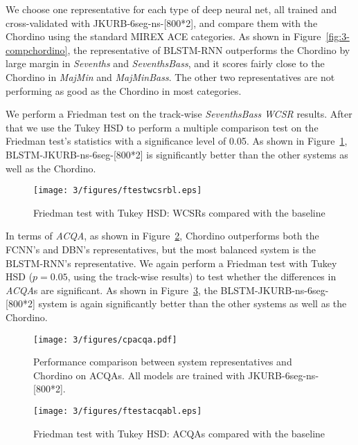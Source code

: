 We choose one representative for each type of deep neural net, all trained and cross-validated with JKURB-6seg-ns-[800*2], and compare them with the Chordino using the standard MIREX ACE categories. As shown in Figure~\ref{fig:3-compchordino}, the representative of BLSTM-RNN outperforms the Chordino by large margin in \textit{Sevenths} and \textit{SeventhsBass}, and it scores fairly close to the Chordino in \textit{MajMin} and \textit{MajMinBass}. The other two representatives are not performing as good as the Chordino in most categories.

We perform a Friedman test on the track-wise \textit{SeventhsBass} \textit{WCSR} results. After that we use the Tukey HSD to perform a multiple comparison test on the Friedman test's statistics with a significance level of 0.05. As shown in Figure~\ref{fig:3-friedmanwcsrbl}, BLSTM-JKURB-ns-6seg-[800*2] is significantly better than the other systems as well as the Chordino.
\begin{figure}[h!]
	\centering
	\texttt{[image: 3/figures/ftestwcsrbl.eps]}
	\caption{Friedman test with Tukey HSD: WCSRs compared with the baseline}
	\label{fig:3-friedmanwcsrbl}
\end{figure}

In terms of \textit{ACQA}, as shown in Figure~\ref{fig:3-acqachordino}, Chordino outperforms both the FCNN's and DBN's representatives, but the most balanced system is the BLSTM-RNN's representative. We again perform a Friedman test with Tukey HSD ($p=0.05$, using the track-wise results) to test whether the differences in \textit{ACQA}s are significant. As shown in Figure~\ref{fig:3-friedmanacqabl}, the BLSTM-JKURB-ns-6seg-[800*2] system is again significantly better than the other systems as well as the Chordino.
\begin{figure}[h!]
	\centering
	\texttt{[image: 3/figures/cpacqa.pdf]}
	\caption{Performance comparison between system representatives and Chordino on ACQAs. All models are trained with JKURB-6seg-ns-[800*2].}
	\label{fig:3-acqachordino}
\end{figure}
\begin{figure}[h!]
	\centering
	\texttt{[image: 3/figures/ftestacqabl.eps]}
	\caption{Friedman test with Tukey HSD: ACQAs compared with the baseline}
	\label{fig:3-friedmanacqabl}
\end{figure}

